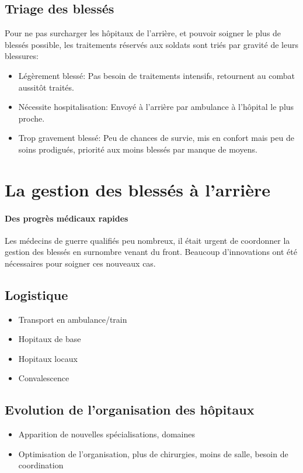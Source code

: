 \documentclass[a4paper, BCOR=0mm, fontsize=12pt, titlepage=firstiscover]{scrreprt}
\begin{document}
		\subsection{Triage des blessés}
			Pour ne pas surcharger les hôpitaux de l'arrière, et pouvoir soigner le plus de blessés possible, les traitements réservés aux soldats sont triés par gravité de leurs blessures:
			\begin{itemize}
				\item Légèrement blessé: Pas besoin de traitements intensifs, retournent au combat aussitôt traités.
				\item Nécessite hospitalisation: Envoyé à l'arrière par ambulance à l'hôpital le plus proche.
				\item Trop gravement blessé: Peu de chances de survie, mis en confort mais peu de soins prodigués, priorité aux moins blessés par manque de moyens. %
			\end{itemize}
	\newpage

	\section{La gestion des blessés à l'arrière}
		
		\paragraph{Des progrès médicaux rapides}
		Les médecins de guerre qualifiés peu nombreux, il était urgent de coordonner la gestion des blessés en surnombre venant du front.
		Beaucoup d'innovations ont été nécessaires pour soigner ces nouveaux cas.
		
		
		\subsection{Logistique}
		\begin{itemize}
			\item Transport en ambulance/train
			\item Hopitaux de base
			\item Hopitaux locaux
			\item Convalescence
		\end{itemize}
		\subsection{Evolution de l'organisation des hôpitaux}
		\begin{itemize}
			\item Apparition de nouvelles spécialisations, domaines
			\item Optimisation de l'organisation, plus de chirurgies, moins de salle, besoin de coordination
		\end{itemize}
\end{document}
